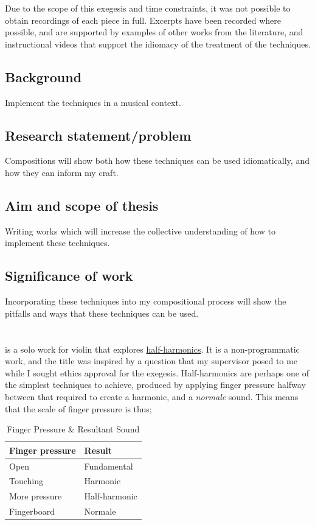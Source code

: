 Due to the scope of this exegesis and time constraints, it was not possible to obtain recordings of each piece in full.
Excerpts have been recorded where possible, and are supported by examples of other works from the literature, and instructional videos that support the idiomacy of the treatment of the techniques.


\subsection{Background}
Implement the techniques in a musical context.
\subsection{Research statement/problem}
Compositions will show both how these techniques can be used idiomatically, and how they can inform my craft.
\subsection{Aim and scope of thesis}
Writing works which will increase the collective understanding of how to implement these techniques.
\subsection{Significance of work}
Incorporating these techniques into my compositional process will show the pitfalls and ways that these techniques can be used.

\section{\violinPiece} \label{sec:violinPiece}
\violinPiece is a solo work for violin that explores \hyperref[sec:halfHarmonicsDiscussion]{half-harmonics}.
It is a non-programmatic work, and the title was inspired by a question that my supervisor posed to me while I sought ethics approval for the exegesis.
Half-harmonics are perhaps one of the simplest techniques to achieve, produced by applying finger pressure halfway between that required to create a harmonic, and a \emph{normale} sound.
This means that the scale of finger pressure is thus;

\begin{table}[]
    \centering
    \caption{Finger Pressure \& Resultant Sound}
    \label{tab:finger-pressure}
    \begin{tabular}{@{}ll@{}}
    \toprule
    Finger pressure & Result        \\ \midrule
    Open            & Fundamental   \\
    Touching        & Harmonic      \\
    More pressure   & Half-harmonic \\
    Fingerboard     & Normale       \\ \bottomrule
    \end{tabular}%
    \end{table}

